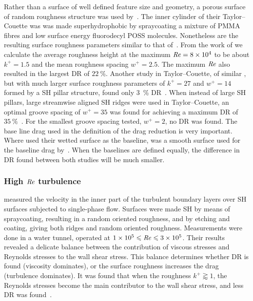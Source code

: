 Rather than a surface of well defined feature size and geometry, a porous surface of random roughness structure was used by~\cite{Srinivasan2011}. The inner cylinder of their Taylor--Couette was was made superhydrophobic by spraycoating a mixture of PMMA fibres and low surface energy fluorodecyl POSS molecules. Nonetheless are the resulting surface roughness parameters similar to that of~\cite{Daniello2009}. From the work of \cite{Srinivasan2015} we calculate the average roughness height at the maximum $\mbox{\textit{Re}} = 8\times 10^4$ to be about $k^+ = 1.5$ and the mean roughness spacing $w^+ = 2.5$. The maximum $\mbox{\textit{Re}}$ also resulted in the largest DR of $\SI{22}{\percent}$. Another study in Taylor--Couette, of similar \Rey, but with much larger surface roughness parameters of $k^+ = 27$ and $w^+ = 14$ formed by a SH pillar structure, found only \SI{3}{\percent} DR~\citep{Panchanathan2018}. When instead of large SH pillars, large streamwise aligned SH ridges were used in Taylor--Couette, an optimal groove spacing of $w^+ = 35$ was found for achieving a maximum DR of $\SI{35}{\percent}$~\citep{vanBuren2017}. For the smallest groove spacing tested, $w^+ = 2$, no DR was found. The base line drag used in the definition of the drag reduction is very important. Where \cite{vanBuren2017} used their wetted surface as the baseline, was a smooth surface used for the baseline drag by~\cite{Panchanathan2018}. When the baselines are defined equally, the difference in DR found between both studies will be much smaller.

\subsubsection*{High $\mbox{\textit{Re}}$ turbulence}
\cite{Ling2016} measured the velocity in the inner part of the turbulent boundary layers over SH surfaces subjected to single-phase flow. Surfaces were made SH by means of spraycoating, resulting in a random oriented roughness, and by etching and coating, giving both ridges and random oriented roughness. Measurements were done in a water tunnel, operated at $1 \times 10^5 \leqslant \mbox{\textit{Re}} \leqslant 3 \times 10^5$. Their results revealed a delicate balance between the contribution of viscous stresses and Reynolds stresses to the wall shear stress. This balance determines whether DR is found (viscosity dominates), or the surface roughness increases the drag (turbulence dominates). It was found that when the roughness $k^+ \gtrapprox 1$, the Reynolds stresses become the main contributor to the wall shear stress, and less DR was found~\citep{Ling2016}.


